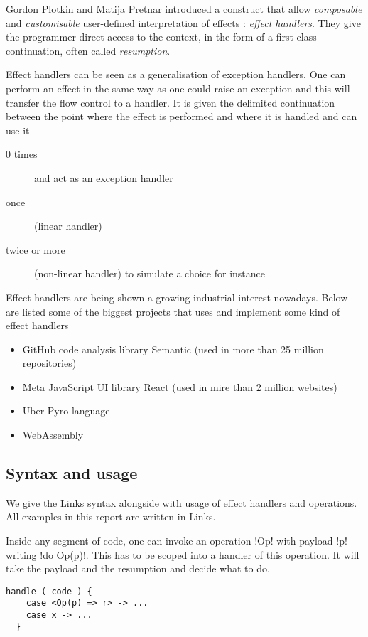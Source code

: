 \documentclass[11pt, nonacm=true, language=french, language=english]{acmart}
\begin{document}
Gordon Plotkin and Matija Pretnar \cite{} introduced a construct that allow \emph{composable} and \emph{customisable} user-defined interpretation of effects : \emph{effect handlers}. They give the programmer direct access to the context, in the form of a first class continuation, often called \emph{resumption}.

Effect handlers can be seen as a generalisation of exception handlers. One can perform an effect in the same way as one could raise an exception and this will transfer the flow control to a handler. It is given the delimited continuation between the point where the effect is performed and where it is handled and can use it
\begin{description}
  \item[0 times] and act as an exception handler
  \item[once] (linear handler)
  \item[twice or more] (non-linear handler) to simulate a choice for instance
\end{description}

Effect handlers are being shown a growing industrial interest nowadays. Below are listed some of the biggest projects that uses and implement some kind of effect handlers
\begin{itemize}
  \item GitHub code analysis library Semantic (used in more than 25 million repositories)
  \item Meta JavaScript UI library React (used in mire than 2 million websites)
  \item Uber Pyro language
  \item WebAssembly
\end{itemize}

\subsection{Syntax and usage}

We give the Links syntax alongside with usage of effect handlers and operations. All examples in this report are written in Links.

Inside any segment of code, one can invoke an operation !Op! with payload !p! writing !do Op(p)!. This has to be scoped into a handler of this operation. It will take the payload and the resumption and decide what to do.

\begin{lstlisting}[caption=Handler,label=lst:handler]
  handle ( code ) {
    case <Op(p) => r> -> ...
    case x -> ...
  }
\end{lstlisting}
\end{document}
